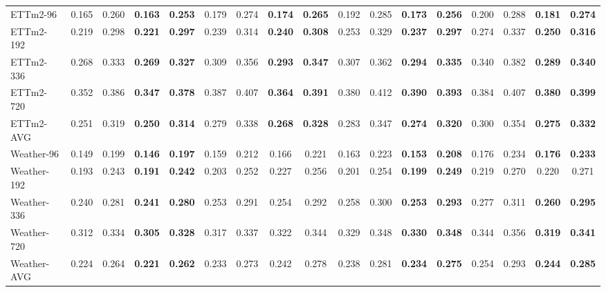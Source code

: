 \begin{table}[t]
{\begin{tabular}{lcccccccccccccccc}
ETTm2-96  & 0.165 & 0.260 & \textbf{0.163} & \textbf{0.253} & 0.179 & 0.274 & \textbf{0.174} & \textbf{0.265} & 0.192 & 0.285 & \textbf{0.173} & \textbf{0.256} & 0.200 & 0.288 & \textbf{0.181} & \textbf{0.274} \\
ETTm2-192 & 0.219 & 0.298 & \textbf{0.221} & \textbf{0.297} & 0.239 & 0.314 & \textbf{0.240} & \textbf{0.308} & 0.253 & 0.329 & \textbf{0.237} & \textbf{0.297} & 0.274 & 0.337 & \textbf{0.250} & \textbf{0.316} \\
ETTm2-336 & 0.268 & 0.333 & \textbf{0.269} & \textbf{0.327} & 0.309 & 0.356 & \textbf{0.293} & \textbf{0.347} & 0.307 & 0.362 & \textbf{0.294} & \textbf{0.335} & 0.340 & 0.382 & \textbf{0.289} & \textbf{0.340} \\
ETTm2-720 & 0.352 & 0.386 & \textbf{0.347} & \textbf{0.378} & 0.387 & 0.407 & \textbf{0.364} & \textbf{0.391} & 0.380 & 0.412 & \textbf{0.390} & \textbf{0.393} & 0.384 & 0.407 & \textbf{0.380} & \textbf{0.399} \\
ETTm2-AVG & 0.251 & 0.319 & \textbf{0.250} & \textbf{0.314} & 0.279 & 0.338 & \textbf{0.268} & \textbf{0.328} & 0.283 & 0.347 & \textbf{0.274} & \textbf{0.320} & 0.300 & 0.354 & \textbf{0.275} & \textbf{0.332} \\
\midrule

Weather-96  & 0.149 & 0.199 & \textbf{0.146} & \textbf{0.197} & 0.159 & 0.212 & {0.166} & {0.221} & 0.163 & 0.223 & \textbf{0.153} & \textbf{0.208} & 0.176 & 0.234 & \textbf{0.176} & \textbf{0.233} \\
Weather-192 & 0.193 & 0.243 & \textbf{0.191} & \textbf{0.242} & 0.203 & 0.252 & {0.227} & {0.256} & 0.201 & 0.254 & \textbf{0.199} & \textbf{0.249} & 0.219 & 0.270 & {0.220} & {0.271} \\
Weather-336 & 0.240 & 0.281 & \textbf{0.241} & \textbf{0.280} & 0.253 & 0.291 & {0.254} & {0.292} & 0.258 & 0.300 & \textbf{0.253} & \textbf{0.293} & 0.277 & 0.311 & \textbf{0.260} & \textbf{0.295} \\
Weather-720 & 0.312 & 0.334 & \textbf{0.305} & \textbf{0.328} & 0.317 & 0.337 & {0.322} & {0.344} & 0.329 & 0.348 & \textbf{0.330} & \textbf{0.348} & 0.344 & 0.356 & \textbf{0.319} & \textbf{0.341} \\
Weather-AVG & 0.224 & 0.264 & \textbf{0.221} & \textbf{0.262} & 0.233 & 0.273 & {0.242} & {0.278} & 0.238 & 0.281 & \textbf{0.234} & \textbf{0.275} & 0.254 & 0.293 & \textbf{0.244} & \textbf{0.285} \\
\midrule


\end{tabular}}
\end{table}
